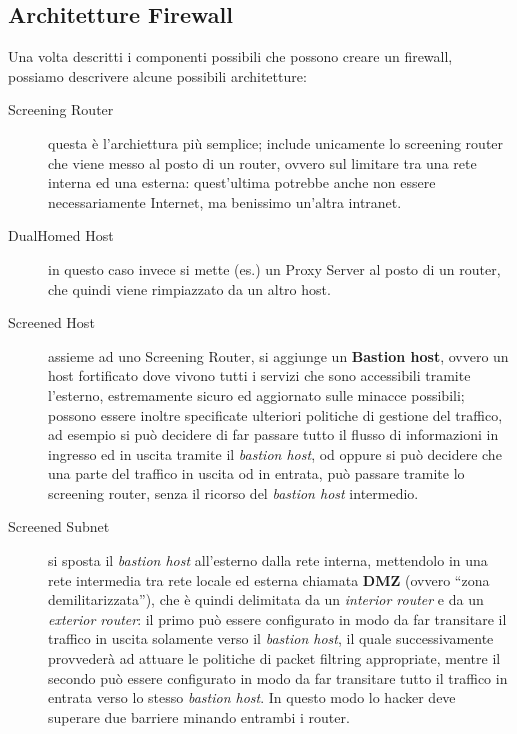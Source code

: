 \subsection{Architetture Firewall}
Una volta descritti i componenti possibili che possono creare un firewall, 
possiamo descrivere alcune possibili architetture:
\begin{description}
\item[Screening Router] questa è l'archiettura più semplice; include unicamente
	lo screening router che viene messo al posto di un router, ovvero sul
	limitare tra una rete interna ed una esterna: quest'ultima potrebbe
	anche non essere necessariamente Internet, ma benissimo un'altra 
	intranet.
\item[DualHomed Host] in questo caso invece si mette (es.) un Proxy Server al posto di
	un router, che quindi viene rimpiazzato da un altro host.
\item[Screened Host] assieme ad uno Screening Router, si aggiunge un \textbf{Bastion
	host}, ovvero un host fortificato dove vivono tutti i servizi che sono
	accessibili tramite l'esterno, estremamente sicuro ed aggiornato sulle
	minacce possibili; possono essere inoltre specificate ulteriori
	politiche di gestione del traffico, ad esempio si può decidere di far 
	passare tutto il flusso di informazioni in ingresso ed in uscita tramite
	il \textit{bastion host}, od oppure si può decidere che una parte del traffico 
	in uscita od in entrata, può passare tramite lo screening router, senza
	il ricorso del \textit{bastion host} intermedio.
\item[Screened Subnet] si sposta il \textit{bastion host} all'esterno dalla rete
	interna, mettendolo in una rete intermedia tra rete locale ed esterna
	chiamata \textbf{DMZ} (ovvero ``zona demilitarizzata''), che è quindi
	delimitata da un \textit{interior router} e da un \textit{exterior router}: il 
	primo può essere configurato in modo da far transitare il traffico in
	uscita solamente verso il \textit{bastion host}, il quale successivamente
	provvederà ad attuare le politiche di packet filtring appropriate,
	mentre il secondo può essere configurato in modo da far transitare 
	tutto il traffico in entrata verso lo stesso \textit{bastion host}. In questo 
	modo lo hacker deve superare due barriere minando entrambi i router.
\end{description}
